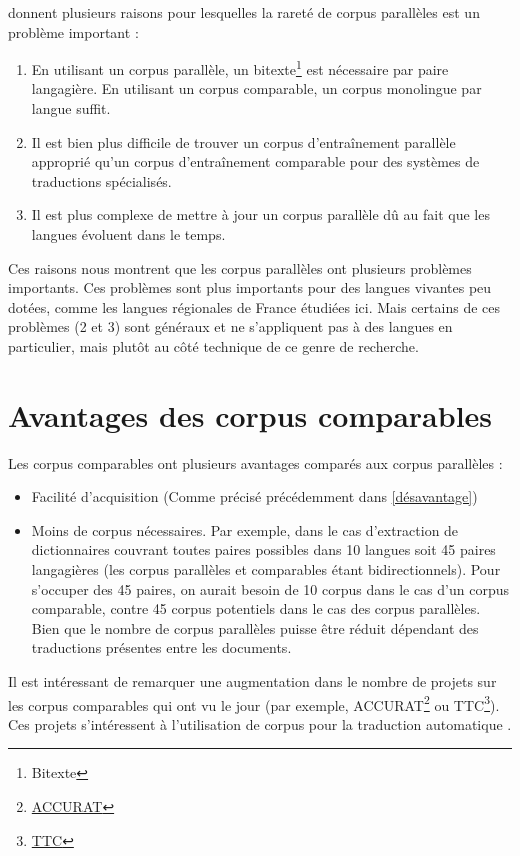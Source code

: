 \citet{sharoff_2016} donnent plusieurs raisons pour lesquelles la rareté de corpus parallèles est un
problème important{ :}
\begin{enumerate}
\item En utilisant un corpus parallèle, un bitexte\footnote{\gls{Bitexte}} est nécessaire par paire langagière. En utilisant un
corpus comparable, un corpus monolingue par langue suffit.
\item Il est bien plus difficile de trouver un corpus d'entraînement parallèle approprié qu'un corpus
d'entraînement comparable pour des systèmes de traductions spécialisés.
\item Il est plus complexe de mettre à jour un corpus parallèle dû au fait que les langues évoluent dans le temps.
\end{enumerate}
Ces raisons nous montrent que les corpus parallèles ont plusieurs problèmes importants. Ces problèmes
sont plus importants pour des langues vivantes peu dotées, comme les langues régionales de France étudiées
ici. Mais certains de ces problèmes (2 et 3) sont généraux et ne s'appliquent pas à des langues en particulier,
mais plutôt au côté technique de ce genre de recherche.

\section{Avantages des corpus comparables}

Les corpus comparables ont plusieurs avantages comparés aux corpus parallèles \citep{sharoff_2013a} { :}
\begin{itemize}
\item Facilité d'acquisition (Comme précisé précédemment dans \ref{désavantage})
\item Moins de corpus nécessaires. Par exemple, dans le cas d'extraction de dictionnaires couvrant toutes paires
possibles dans 10 langues soit 45 paires langagières (les corpus parallèles et comparables étant
bidirectionnels). Pour s'occuper des 45 paires, on aurait besoin de 10 corpus dans le cas d'un corpus
comparable, contre 45 corpus potentiels dans le cas des corpus parallèles. Bien que le nombre de corpus
parallèles puisse être réduit dépendant des traductions présentes entre les documents.
\end{itemize}

Il est intéressant de remarquer une augmentation dans le nombre de projets sur les corpus
comparables qui ont vu le jour (par exemple, ACCURAT\footnote{\href{http://www.accurat-project.eu/}{ACCURAT}} ou
TTC\footnote{\href{https://www.ttc-project.eu/concept-and-objectives/}{TTC}}). Ces projets s'intéressent à
l'utilisation de corpus pour la traduction automatique \citep{sharoff_2016}.

